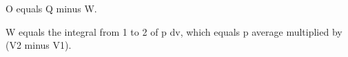 O equals Q minus W.  

W equals the integral from 1 to 2 of p dv, which equals p average multiplied by (V2 minus V1).